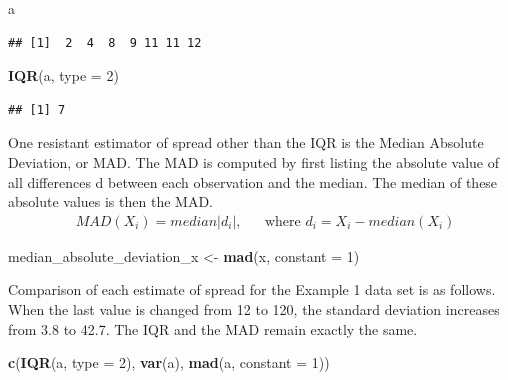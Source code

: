 \documentclass[]{book}
\newenvironment{Shaded}{\begin{snugshade}}{\end{snugshade}}
\newcommand{\DataTypeTok}[1]{\textcolor[rgb]{0.13,0.29,0.53}{#1}}
\newcommand{\DecValTok}[1]{\textcolor[rgb]{0.00,0.00,0.81}{#1}}
\newcommand{\KeywordTok}[1]{\textcolor[rgb]{0.13,0.29,0.53}{\textbf{#1}}}
\newcommand{\NormalTok}[1]{#1}
\newcommand{\StringTok}[1]{\textcolor[rgb]{0.31,0.60,0.02}{#1}}
\begin{document}
\begin{Shaded}
\begin{Highlighting}[]
\NormalTok{a}
\end{Highlighting}
\end{Shaded}

\begin{verbatim}
## [1]  2  4  8  9 11 11 12
\end{verbatim}

\begin{Shaded}
\begin{Highlighting}[]
\KeywordTok{IQR}\NormalTok{(a, }\DataTypeTok{type =} \DecValTok{2}\NormalTok{)}
\end{Highlighting}
\end{Shaded}

\begin{verbatim}
## [1] 7
\end{verbatim}

One resistant estimator of spread other than the IQR is the Median Absolute Deviation, or MAD. The MAD is computed by first listing the absolute value of all differences \textbar{}d\textbar{} between each observation and the median. The median of these absolute values is then the MAD.
\begin{equation}
\begin{aligned}
& MAD (X_{i}) = median |d_{i}|, && \text{where $d_{i} = X_{i} - median(X_{i})$}
\end {aligned}
\label{eq:1-9}
\end{equation}

\begin{Shaded}
\begin{Highlighting}[]
\NormalTok{median_absolute_deviation_x <-}\StringTok{ }\KeywordTok{mad}\NormalTok{(x, }\DataTypeTok{constant =} \DecValTok{1}\NormalTok{)}
\end{Highlighting}
\end{Shaded}

Comparison of each estimate of spread for the Example 1 data set is as follows. When the last value is changed from 12 to 120, the standard deviation increases from 3.8 to 42.7. The IQR and the MAD remain exactly the same.

\begin{Shaded}
\begin{Highlighting}[]
\KeywordTok{c}\NormalTok{(}\KeywordTok{IQR}\NormalTok{(a, }\DataTypeTok{type =} \DecValTok{2}\NormalTok{), }\KeywordTok{var}\NormalTok{(a), }\KeywordTok{mad}\NormalTok{(a, }\DataTypeTok{constant =} \DecValTok{1}\NormalTok{))}
\end{Highlighting}
\end{Shaded}
\end{document}
